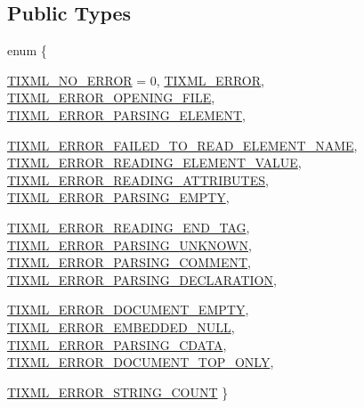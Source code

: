 \subsection*{Public Types}
\begin{DoxyCompactItemize}
\item 
enum \{ \par
\hyperlink{classTiXmlBase_a9a7e9344415956ab96e8c75f6a0bbd48a750a76ca602241c416d5ec357d55fba1}{TIXML\_\-NO\_\-ERROR} =  0, 
\hyperlink{classTiXmlBase_a9a7e9344415956ab96e8c75f6a0bbd48abcabc1b8efabeda1cc4352aa73d64390}{TIXML\_\-ERROR}, 
\hyperlink{classTiXmlBase_a9a7e9344415956ab96e8c75f6a0bbd48ab803949b8f12e03b5b57f86d9c52b614}{TIXML\_\-ERROR\_\-OPENING\_\-FILE}, 
\hyperlink{classTiXmlBase_a9a7e9344415956ab96e8c75f6a0bbd48a5cbfcf7fe5e67f0cd1aef98deac55dd2}{TIXML\_\-ERROR\_\-PARSING\_\-ELEMENT}, 
\par
\hyperlink{classTiXmlBase_a9a7e9344415956ab96e8c75f6a0bbd48adcc31ca78a9d507a88c9fafb3d18a3c4}{TIXML\_\-ERROR\_\-FAILED\_\-TO\_\-READ\_\-ELEMENT\_\-NAME}, 
\hyperlink{classTiXmlBase_a9a7e9344415956ab96e8c75f6a0bbd48afefdc75db23215e846605a2b5af0c2d3}{TIXML\_\-ERROR\_\-READING\_\-ELEMENT\_\-VALUE}, 
\hyperlink{classTiXmlBase_a9a7e9344415956ab96e8c75f6a0bbd48a670fac23171b64829f90639cc3696d6e}{TIXML\_\-ERROR\_\-READING\_\-ATTRIBUTES}, 
\hyperlink{classTiXmlBase_a9a7e9344415956ab96e8c75f6a0bbd48a5f2aee664733a20f13f6f77556b9fa85}{TIXML\_\-ERROR\_\-PARSING\_\-EMPTY}, 
\par
\hyperlink{classTiXmlBase_a9a7e9344415956ab96e8c75f6a0bbd48a175f7c72e2f9630bb96ef5137b325502}{TIXML\_\-ERROR\_\-READING\_\-END\_\-TAG}, 
\hyperlink{classTiXmlBase_a9a7e9344415956ab96e8c75f6a0bbd48a24c814fdcf1d84704869e6f76b19cb6e}{TIXML\_\-ERROR\_\-PARSING\_\-UNKNOWN}, 
\hyperlink{classTiXmlBase_a9a7e9344415956ab96e8c75f6a0bbd48a72e3072a44be499edb89593f6ce10f6c}{TIXML\_\-ERROR\_\-PARSING\_\-COMMENT}, 
\hyperlink{classTiXmlBase_a9a7e9344415956ab96e8c75f6a0bbd48a4c200f9d125027ab449e2be7be471ba0}{TIXML\_\-ERROR\_\-PARSING\_\-DECLARATION}, 
\par
\hyperlink{classTiXmlBase_a9a7e9344415956ab96e8c75f6a0bbd48ab345f3e42e6ae9cdedee2b95e4d461b9}{TIXML\_\-ERROR\_\-DOCUMENT\_\-EMPTY}, 
\hyperlink{classTiXmlBase_a9a7e9344415956ab96e8c75f6a0bbd48ade7edbad3a94a6c161cac2638f380e17}{TIXML\_\-ERROR\_\-EMBEDDED\_\-NULL}, 
\hyperlink{classTiXmlBase_a9a7e9344415956ab96e8c75f6a0bbd48aab2c858631b5d38eae1e6675949b9cd4}{TIXML\_\-ERROR\_\-PARSING\_\-CDATA}, 
\hyperlink{classTiXmlBase_a9a7e9344415956ab96e8c75f6a0bbd48a679b15d950f29257700a724bb118c34d}{TIXML\_\-ERROR\_\-DOCUMENT\_\-TOP\_\-ONLY}, 
\par
\hyperlink{classTiXmlBase_a9a7e9344415956ab96e8c75f6a0bbd48a14552894942250efcec6b00dc52fc48a}{TIXML\_\-ERROR\_\-STRING\_\-COUNT}
 \}
\end{DoxyCompactItemize}
